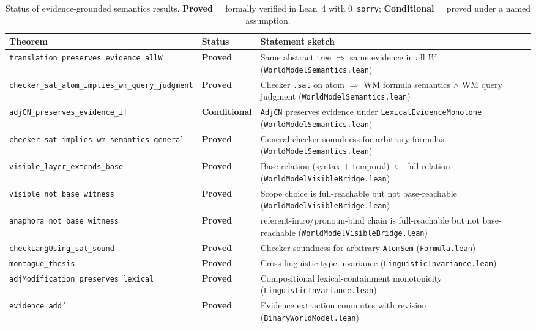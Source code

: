\documentclass[11pt]{article}
\newcommand{\code}[1]{\texttt{#1}}
\begin{document}
\begin{table}[ht]
\centering
\caption{Status of evidence-grounded semantics results.
  \textbf{Proved} = formally verified in Lean~4 with 0~\code{sorry};
  \textbf{Conditional} = proved under a named assumption.}
\label{tab:status}
\small
\begin{tabular}{@{}llp{6.5cm}@{}}
\toprule
\textbf{Theorem} & \textbf{Status} & \textbf{Statement sketch} \\
\midrule
\code{translation\_preserves\_evidence\_allW}
  & \textbf{Proved}
  & Same abstract tree $\Rightarrow$ same evidence in all $W$
    (\code{WorldModelSemantics.lean}) \\
\code{checker\_sat\_atom\_implies\_wm\_query\_judgment}
  & \textbf{Proved}
  & Checker \code{.sat} on atom $\Rightarrow$
    WM formula semantics $\land$ WM query judgment
    (\code{WorldModelSemantics.lean}) \\
\code{adjCN\_preserves\_evidence\_if}
  & \textbf{Conditional}
  & \code{AdjCN} preserves evidence under
    \code{LexicalEvidenceMonotone}
    (\code{WorldModelSemantics.lean}) \\
\code{checker\_sat\_implies\_wm\_semantics\_general}
  & \textbf{Proved}
  & General checker soundness for arbitrary formulas
    (\code{WorldModelSemantics.lean}) \\
\code{visible\_layer\_extends\_base}
  & \textbf{Proved}
  & Base relation (syntax $+$ temporal) $\subseteq$ full relation
    (\code{WorldModelVisibleBridge.lean}) \\
\code{visible\_not\_base\_witness}
  & \textbf{Proved}
  & Scope choice is full-reachable but not base-reachable
    (\code{WorldModelVisibleBridge.lean}) \\
\code{anaphora\_not\_base\_witness}
  & \textbf{Proved}
  & referent-intro/pronoun-bind chain is full-reachable but not base-reachable
    (\code{WorldModelVisibleBridge.lean}) \\
\midrule
\code{checkLangUsing\_sat\_sound}
  & \textbf{Proved}
  & Checker soundness for arbitrary \code{AtomSem}
    (\code{Formula.lean}) \\
\code{montague\_thesis}
  & \textbf{Proved}
  & Cross-linguistic type invariance
    (\code{LinguisticInvariance.lean}) \\
\code{adjModification\_preserves\_lexical}
  & \textbf{Proved}
  & Compositional lexical-containment monotonicity
    (\code{LinguisticInvariance.lean}) \\
\code{evidence\_add'}
  & \textbf{Proved}
  & Evidence extraction commutes with revision
    (\code{BinaryWorldModel.lean}) \\
\bottomrule
\end{tabular}
\end{table}
\end{document}
